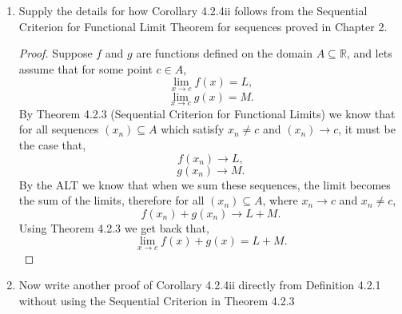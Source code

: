 \documentclass[12pt]{article}
\makeatletter
\theoremstyle{homework}
\newenvironment{exercise}[1]
{\def\@currentlabel{#1}\exercisecore}
{\endexercisecore}
\newcommand{\Reals}{\ensuremath{\mathbb R}}
\makeatother
\begin{document}
\begin{exercise}{Abbott 4.2.1 a,b}
\begin{enumerate}
  \item Supply the details for how Corollary 4.2.4ii follows from the Sequential Criterion for Functional
  Limit Theorem for sequences proved in Chapter 2.\\

  \begin{proof} Suppose $f$ and $g$ are functions defined on the domain $A \subseteq \Reals$, and lets assume that 
    for some point $c \in A$,
    \begin{equation*}
      \lim_{x \to c} f(x) = L,
    \end{equation*} 
    \begin{equation*}
      \lim_{x \to c} g(x) = M.
    \end{equation*} 
    By Theorem 4.2.3 (Sequential Criterion for Functional Limits) we know that for all sequences $(x_n) \subseteq A$
    which satisfy $x_n \neq c$ and $(x_n) \to c$, it must be the case that,
    \begin{equation*}
      f(x_n) \to L,
    \end{equation*}
    \begin{equation*}
      g(x_n) \to M.
    \end{equation*}
    By the ALT we know that when we sum these sequences, the limit becomes the sum of the limits, therefore for all $(x_n) \subseteq A$, where $x_n \to c$ and $x_n \neq c$,
    \begin{equation*}
      f(x_n) + g(x_n)  \to L + M.
    \end{equation*}
    Using Theorem 4.2.3 we get back that,
    \begin{equation*}
      \lim_{x \to c} f(x) + g(x) = L + M.
    \end{equation*} 
  \end{proof}
  \vspace{.25 in}
  
  
  \item Now write another proof of Corollary 4.2.4ii directly from Definition 4.2.1 without using the Sequential Criterion
  in Theorem 4.2.3\\


\end{enumerate}
\end{exercise}
\end{document}
